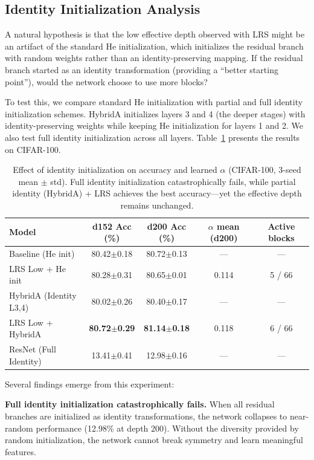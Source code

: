 \documentclass[preprint,12pt]{elsarticle}
\begin{document}
\subsection{Identity Initialization Analysis}
\label{sec:identity_init}

A natural hypothesis is that the low effective depth observed with LRS might be an artifact of the standard He initialization, which initializes the residual branch with random weights rather than an identity-preserving mapping. If the residual branch started as an identity transformation (providing a ``better starting point''), would the network choose to use more blocks?

To test this, we compare standard He initialization with partial and full identity initialization schemes. HybridA initializes layers 3 and 4 (the deeper stages) with identity-preserving weights while keeping He initialization for layers 1 and 2. We also test full identity initialization across all layers. Table~\ref{tab:identity_init} presents the results on CIFAR-100.

\begin{table}[t]
\centering
\caption{Effect of identity initialization on accuracy and learned $\alpha$ (CIFAR-100, 3-seed mean $\pm$ std). Full identity initialization catastrophically fails, while partial identity (HybridA) + LRS achieves the best accuracy---yet the effective depth remains unchanged.}
\label{tab:identity_init}
\begin{tabular}{lcccc}
\toprule
\textbf{Model} & \textbf{d152 Acc (\%)} & \textbf{d200 Acc (\%)} & \textbf{$\alpha$ mean (d200)} & \textbf{Active blocks} \\
\midrule
Baseline (He init) & 80.42$\pm$0.18 & 80.72$\pm$0.13 & --- & --- \\
LRS Low + He init & 80.28$\pm$0.31 & 80.65$\pm$0.01 & 0.114 & 5 / 66 \\
HybridA (Identity L3,4) & 80.02$\pm$0.26 & 80.40$\pm$0.17 & --- & --- \\
LRS Low + HybridA & \textbf{80.72$\pm$0.29} & \textbf{81.14$\pm$0.18} & 0.118 & 6 / 66 \\
ResNet (Full Identity) & 13.41$\pm$0.41 & 12.98$\pm$0.16 & --- & --- \\
\bottomrule
\end{tabular}
\end{table}

Several findings emerge from this experiment:

\textbf{Full identity initialization catastrophically fails.} When all residual branches are initialized as identity transformations, the network collapses to near-random performance (12.98\% at depth 200). Without the diversity provided by random initialization, the network cannot break symmetry and learn meaningful features.
\end{document}
